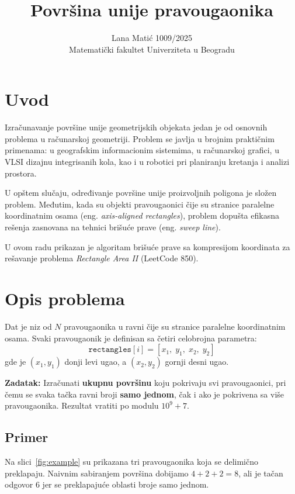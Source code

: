 \documentclass{article}
\title{\textbf{Površina unije pravougaonika}}
\author{Lana Matić 1009/2025\\
\small Matematički fakultet Univerziteta u Beogradu}
\date{}
\begin{document}
\maketitle

\section{Uvod}

Izračunavanje površine unije geometrijskih objekata jedan je od osnovnih problema u računarskoj geometriji. Problem se javlja u brojnim praktičnim primenama: u geografskim informacionim sistemima, u računarskoj grafici, u VLSI dizajnu integrisanih kola, kao i u robotici pri planiranju kretanja i analizi prostora.

U opštem slučaju, određivanje površine unije proizvoljnih poligona je složen problem. Međutim, kada su objekti pravougaonici čije su stranice paralelne koordinatnim osama (eng. \textit{axis-aligned rectangles}), problem dopušta efikasna rešenja zasnovana na tehnici brišuće prave (eng. \textit{sweep line}).

U ovom radu prikazan je algoritam brišuće prave sa kompresijom koordinata za rešavanje problema \textit{Rectangle Area II} (LeetCode 850). 


\section{Opis problema}

Dat je niz od $N$ pravougaonika u ravni čije su stranice paralelne koordinatnim osama. Svaki pravougaonik je definisan sa četiri celobrojna parametra:
\[
\texttt{rectangles}[i] = [x_1,\; y_1,\; x_2,\; y_2]
\]
gde je $(x_1, y_1)$ donji levi ugao, a $(x_2, y_2)$ gornji desni ugao.

\textbf{Zadatak:} Izračunati \textbf{ukupnu površinu} koju pokrivaju svi pravougaonici, pri čemu se svaka tačka ravni broji \textbf{samo jednom}, čak i ako je pokrivena sa više pravougaonika. Rezultat vratiti po modulu $10^9 + 7$.

\subsection{Primer}
Na slici~\ref{fig:example} su prikazana tri pravougaonika koja se delimično preklapaju. Naivnim sabiranjem površina dobijamo $4 + 2 + 2 = 8$, ali je tačan odgovor 6 jer se preklapajuće oblasti broje samo jednom.
\end{document}
